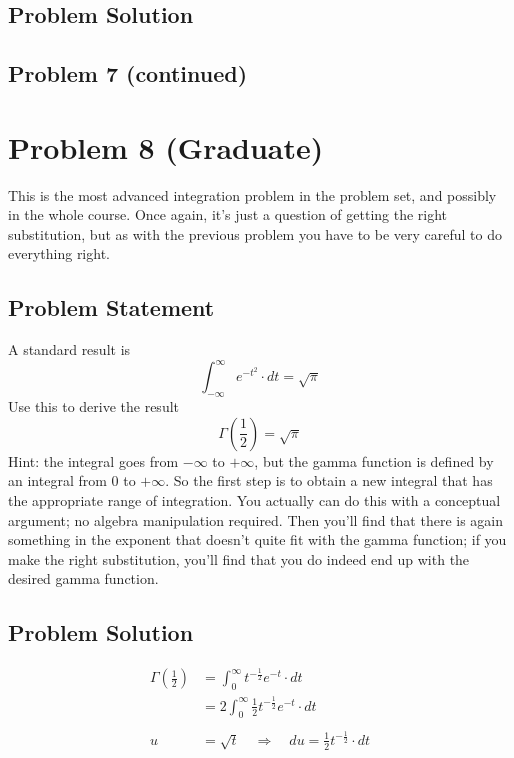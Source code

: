\documentclass[12pt]{article}
\theoremstyle{definition}
\begin{document}
\subsection*{Problem Solution}

\newpage
\subsection*{Problem 7 (continued)}



\newpage
\section*{Problem 8 (Graduate)}

This is the most advanced integration problem in the problem set, and possibly in the whole course. Once again, it's just a question of getting the right substitution, but as with the previous problem you have to be very careful to do everything right.

\subsection*{Problem Statement}

A standard result is
$$
\int_{-\infty}^\infty e^{-t^2} \cdot dt = \sqrt{\pi}
$$
Use this to derive the result
$$
\Gamma \left ( \frac{1}{2} \right ) = \sqrt{\pi}
$$
Hint: the integral goes from $-\infty$ to $+\infty$, but the gamma function is defined by an integral from $0$ to $+\infty$. So the first step is to obtain a new integral that has the appropriate range of integration. You actually can do this with a conceptual argument; no algebra manipulation required. Then you'll find that there is again something in the exponent that doesn't quite fit with the gamma function; if you make the right substitution, you'll find that you do indeed end up with the desired gamma function.

\subsection*{Problem Solution}
\begin{align*}
\Gamma \left ( \frac{1}{2} \right ) &= \int_0^\infty t^{-\frac{1}{2}}e^{-t} \cdot dt\\
&= 2 \int_0^\infty \frac{1}{2}t^{-\frac{1}{2}}e^{-t} \cdot dt\\\\
u &= \sqrt{t} \quad\Rightarrow\quad du = \frac{1}{2}t^{-\frac{1}{2}} \cdot dt\\
\end{align*}
\end{document}
